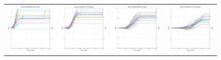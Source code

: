 \begin{figure}
\begin{tabular}{cccc}
\hspace{-0.5cm}\includegraphics[width = 1.55in]{images/Visualizations/MCTSvsRANDOM/1000ms5x5.png} &
\hspace{-0.5cm}\includegraphics[width = 1.55in]{images/Visualizations/MCTSvsRANDOM/1000ms7x7.png} &
\hspace{-0.5cm}\includegraphics[width = 1.55in]{images/Visualizations/MCTSvsRANDOM/1000ms9x9.png} &
\hspace{-0.5cm}\includegraphics[width = 1.55in]{images/Visualizations/MCTSvsRANDOM/1000ms11x11.png} \\


\end{tabular}
\end{figure}
